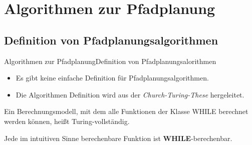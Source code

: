 \documentclass[t,aspectratio=169,dvipsnames]{beamer}
\begin{document}
\section{Algorithmen zur Pfadplanung}
\subsection{Definition von Pfadplanungsalgorithmen}
\begin{frame}{Algorithmen zur Pfadplanung}{Definition von Pfadplanungsalorithmen}
	
	\begin{itemize}
				\item Es gibt keine einfache Definition für Pfadplanungsalgorithmen.
				\item Die Algorithmen Definition wird aus der \textit{Church-Turing-These} hergeleitet.
				
	\end{itemize}
		\begin{theorem}
			Ein Berechnungsmodell, mit dem alle Funktionen
			der Klasse WHILE berechnet werden können, heißt
			Turing-vollständig.
		\end{theorem}
		\begin{theorem}
			Jede im intuitiven Sinne berechenbare Funktion ist \textbf{WHILE}-berechenbar.
		\end{theorem}
\end{frame}
	
\end{document}
